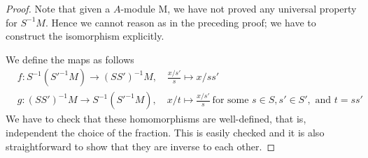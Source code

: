 \documentclass[10pt,a4paper]{amsart}
\theoremstyle{plain}
\theoremstyle{definition}
\theoremstyle{remark}
\numberwithin{equation}{subsection}
\begin{document}
\begin{proof}
Note that given a $A$-module M, we have not proved any
universal property for $S^{-1}M$. Hence we cannot reason
as in the preceding proof; we have to construct the isomorphism explicitly.

\medskip\noindent
We define the maps as follows
\begin{align*}
& f : S^{-1}(S'^{-1}M) \longrightarrow (SS')^{-1}M, \quad \frac{x/s'}{s}\mapsto
x/ss'\\
& g : (SS')^{-1}M \longrightarrow S^{-1}(S'^{-1}M), \quad x/t\mapsto
\frac{x/s'}{s}\ \text{for some }s\in S, s'\in S', \text{ and }
t = ss'
\end{align*}
We have to check that these homomorphisms are well-defined, that is,
independent the choice of the fraction. This is easily checked and it is also
straightforward to show that they are inverse to each other.
\end{proof}
\end{document}
